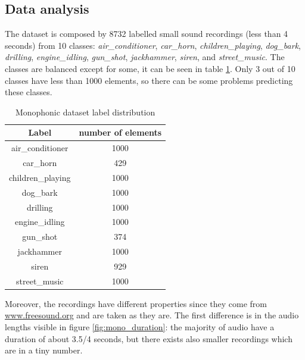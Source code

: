 \documentclass{article}
\begin{document}
\subsection{Data analysis}
\label{subsec:mono_analysis}

The dataset is composed by 8732 labelled small sound recordings (less than 4 seconds) from 10 classes: \textit{air\_conditioner}, \textit{car\_horn}, \textit{children\_playing}, \textit{dog\_bark}, \textit{drilling}, \textit{engine\_idling}, \textit{gun\_shot}, \textit{jackhammer}, \textit{siren}, and \textit{street\_music}. The classes are balanced except for some, it can be seen in table \ref{tab:mono_distribution}. Only 3 out of 10 classes have less than 1000 elements, so there can be some problems predicting these classes.

\begin{table}[H]
	\begin{center}
		\begin{tabular}{ |c | c | }
			\hline
			Label 				& number of elements \\ 
			\hline
			air\_conditioner 	& 1000 \\
			\hline
			car\_horn 			& 429 \\
			\hline
			children\_playing 	& 1000 \\
			\hline
			dog\_bark 			& 1000 \\
			\hline
			drilling 			& 1000 \\
			\hline
			engine\_idling 		& 1000 \\
			\hline
			gun\_shot 			& 374 \\
			\hline
			jackhammer 			& 1000 \\
			\hline
			siren 				& 929 \\
			\hline
			street\_music 		& 1000 \\
			\hline
		\end{tabular}
		\caption{Monophonic dataset label distribution}
		\label{tab:mono_distribution}
	\end{center}
\end{table}

Moreover, the recordings have different properties since they come from \url{www.freesound.org} and are taken as they are. The first difference is in the audio lengths visible in figure \ref{fig:mono_duration}: the majority of audio have a duration of about 3.5/4 seconds, but there exists also smaller recordings which are in a tiny number.
\end{document}
